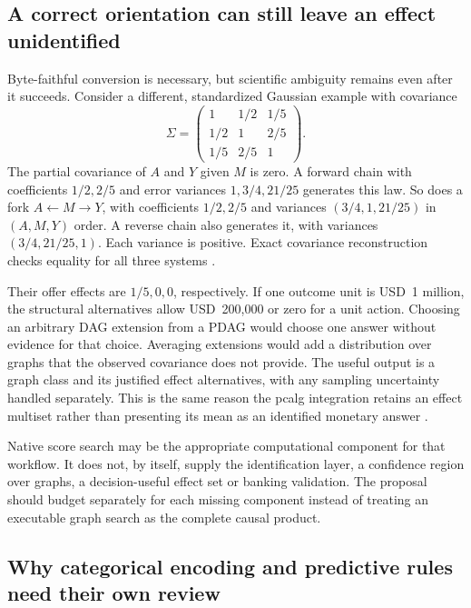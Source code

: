 \subsection{A correct orientation can still leave an effect unidentified}

Byte-faithful conversion is necessary, but scientific ambiguity remains even
after it succeeds. Consider a different, standardized Gaussian example with
covariance
\[
 \Sigma=\begin{pmatrix}
 1&1/2&1/5\\1/2&1&2/5\\1/5&2/5&1
 \end{pmatrix}.
\]
The partial covariance of \(A\) and \(Y\) given \(M\) is zero. A forward chain
with coefficients \(1/2,2/5\) and error variances \(1,3/4,21/25\) generates
this law. So does a fork \(A\leftarrow M\to Y\), with coefficients
\(1/2,2/5\) and variances \((3/4,1,21/25)\) in \((A,M,Y)\) order.
A reverse chain also generates it, with variances
\((3/4,21/25,1)\). Each variance is positive. Exact covariance reconstruction
checks equality for all three systems \citep{exec13_cxx_examples}.

Their offer effects are \(1/5,0,0\), respectively. If one outcome unit is
USD~1 million, the structural alternatives allow USD~200,000 or zero for a
unit action. Choosing an arbitrary DAG extension from a PDAG would choose
one answer without evidence for that choice. Averaging extensions would add
a distribution over graphs that the observed covariance does not provide.
The useful output is a graph class and its justified effect alternatives,
with any sampling uncertainty handled separately. This is the same reason
the pcalg integration retains an effect multiset rather than presenting its
mean as an identified monetary answer \citep{exec13_pcalg_reuse_primary}.

Native score search may be the appropriate computational component for that
workflow. It does not, by itself, supply the identification layer, a confidence
region over graphs, a decision-useful effect set or banking validation. The
proposal should budget separately for each missing component instead of
treating an executable graph search as the complete causal product.

\subsection{Why categorical encoding and predictive rules need their own review}

